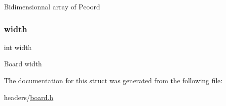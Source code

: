 Bidimensionnal array of Pcoord \mbox{\label{structboard_a2474a5474cbff19523a51eb1de01cda4}} 
\subsubsection{\texorpdfstring{width}{width}}
{\footnotesize\ttfamily int width}

Board width 

The documentation for this struct was generated from the following file\+:\begin{DoxyCompactItemize}
\item 
headers/\hyperlink{board_8h}{board.\+h}\end{DoxyCompactItemize}
